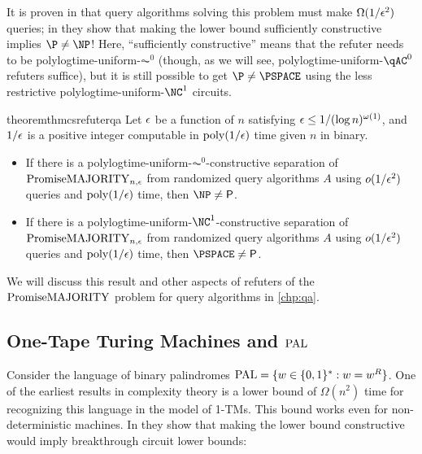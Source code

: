 It is proven in \cite{Canetti95} that query algorithms solving this problem must make $\Omega(1/\epsilon^2)$ 
queries; in \cite{ConstructiveSeparations} they show that making the lower bound sufficiently constructive
implies $\P \neq \NP$! Here, ``sufficiently constructive'' means that the refuter needs to be 
polylogtime-uniform-$\AC^0$ (though, as we will see, polylogtime-uniform-$\qAC^0$ refuters suffice), but
it is still possible to get $\P \neq \PSPACE$ using the less restrictive polylogtime-uniform-$\NC^1$ circuits.

\begin{restatable}{theorem}{thmcsrefuterqa}\label{thm:csrefuterqa} 
	Let $\epsilon$ be a function of $n$ satisfying $\epsilon \leq 1/(\log n)^{\omega(1)}$, and $1/\epsilon$ is a positive integer
     computable in $\text{poly}(1/\epsilon)$ time given $n$ in binary.
	\begin{itemize}
		\item If there is a polylogtime-uniform-$\AC^0$-constructive separation of $\mathrm{PromiseMAJORITY}_{n,\epsilon}$ from randomized
         query algorithms $A$ using $o(1/\epsilon^2)$ queries and $\text{poly}(1/\epsilon)$ time, then $\NP \ne \PTIME$.
		\item If there is a polylogtime-uniform-$\NC^1$-constructive separation of $\mathrm{PromiseMAJORITY}_{n,\epsilon}$ from randomized
         query algorithms $A$ using $o(1/\epsilon^2)$ queries and $\text{poly}(1/\epsilon)$ time, then $\PSPACE \ne \PTIME$.
	\end{itemize}
\end{restatable}

We will discuss this result and other aspects of refuters of the $\mathrm{PromiseMAJORITY}$ problem 
for query algorithms in \cref{chp:qa}.

\subsection{One-Tape Turing Machines and $\mathrm{PAL}$}

Consider the language of binary palindromes $\mathrm{PAL} = \{w \in \{0, 1\}^* : w = w^R\}$. One of the 
earliest results in complexity theory is a lower bound of $\Omega(n^2)$ time for recognizing 
this language in the model of 1-TMs. This bound works even for non-deterministic machines. 
In \cite{ConstructiveSeparations} they show that making the lower bound constructive
would imply breakthrough circuit lower bounds:


